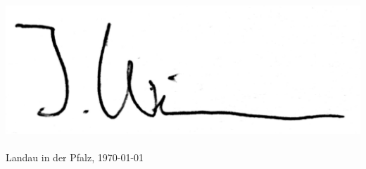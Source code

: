 \documentclass[
]{friggeri-cv}
\begin{document}
\vspace*{-.66cm}
\hspace*{-.3cm}
\includegraphics[width=.3\textwidth]{signature.pdf}\\\\
{\footnotesize
  Landau in der Pfalz, \monthyeardate\today
}
%

% 
\end{document}
